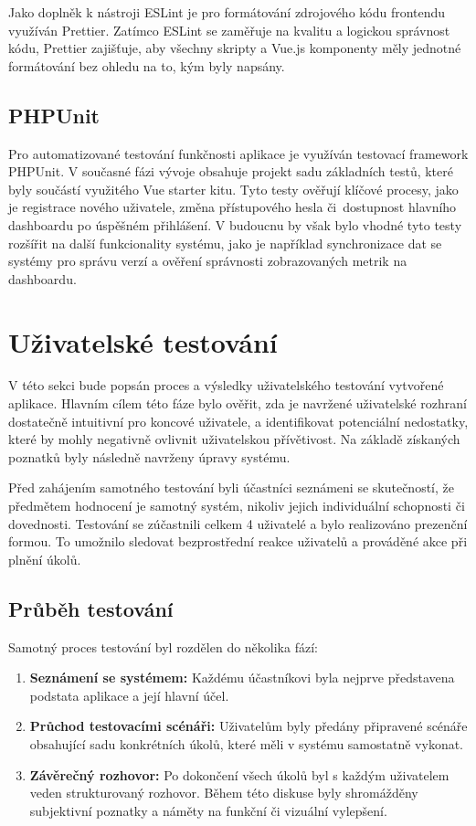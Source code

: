 Jako doplněk k nástroji ESLint je pro formátování zdrojového kódu frontendu využíván Prettier. Zatímco ESLint se zaměřuje na kvalitu a logickou správnost kódu, Prettier zajišťuje, aby všechny skripty a Vue.js komponenty měly jednotné formátování bez ohledu na to, kým byly napsány.

\subsection{PHPUnit}
Pro automatizované testování funkčnosti aplikace je využíván testovací framework PHPUnit. V současné fázi vývoje obsahuje projekt sadu základních testů, které byly součástí využitého Vue starter kitu. Tyto testy ověřují klíčové procesy, jako je registrace nového uživatele, změna přístupového hesla či~dostupnost hlavního dashboardu po úspěšném přihlášení. V budoucnu by však bylo vhodné tyto testy rozšířit na další funkcionality systému, jako je například synchronizace dat se systémy pro správu verzí a ověření správnosti zobrazovaných metrik na dashboardu.

\section{Uživatelské testování}
V této sekci bude popsán proces a výsledky uživatelského testování vytvořené aplikace. Hlavním cílem této fáze bylo ověřit, zda je navržené uživatelské rozhraní dostatečně intuitivní pro koncové uživatele, a identifikovat potenciální nedostatky, které by mohly negativně ovlivnit uživatelskou přívětivost. Na základě získaných poznatků byly následně navrženy úpravy systému.

Před zahájením samotného testování byli účastníci seznámeni se skutečností, že předmětem hodnocení je samotný systém, nikoliv jejich individuální schopnosti či dovednosti. Testování se zúčastnili celkem 4 uživatelé a bylo realizováno prezenční formou. To umožnilo sledovat bezprostřední reakce uživatelů a prováděné akce při plnění úkolů.

\newpage
\subsection{Průběh testování}
Samotný proces testování byl rozdělen do několika fází:

\begin{enumerate}
    \item \textbf{Seznámení se systémem:} Každému účastníkovi byla nejprve představena podstata aplikace a její hlavní účel.
    \item \textbf{Průchod testovacími scénáři:} Uživatelům byly předány připravené scénáře obsahující sadu konkrétních úkolů, které měli v systému samostatně vykonat.
    \item \textbf{Závěrečný rozhovor:} Po dokončení všech úkolů byl s každým uživatelem veden strukturovaný rozhovor. Během této diskuse byly shromážděny subjektivní poznatky a náměty na funkční či vizuální vylepšení.
\end{enumerate}

